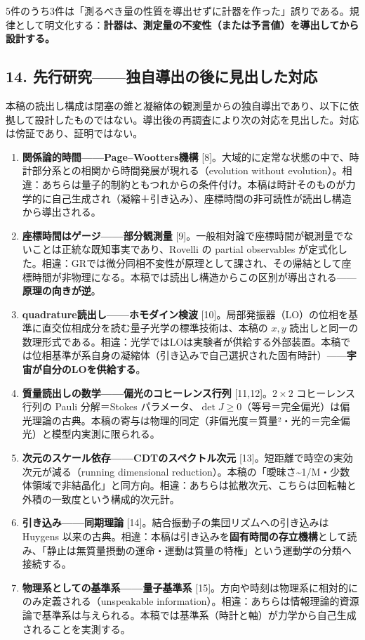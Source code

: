 \documentclass[
  a4paper,
]{ltjsarticle}
\providecommand{\tightlist}{%
  \setlength{\itemsep}{0pt}\setlength{\parskip}{0pt}}
\begin{document}
5件のうち3件は「測るべき量の性質を導出せずに計器を作った」誤りである。規律として明文化する：\textbf{計器は、測定量の不変性（または予言値）を導出してから設計する。}

\subsection{14.
先行研究------独自導出の後に見出した対応}\label{ux5148ux884cux7814ux7a76ux72ecux81eaux5c0eux51faux306eux5f8cux306bux898bux51faux3057ux305fux5bfeux5fdc}

本稿の読出し構成は閉塞の錐と凝縮体の観測量からの独自導出であり、以下に依拠して設計したものではない。導出後の再調査により次の対応を見出した。対応は傍証であり、証明ではない。

\begin{enumerate}
\def\labelenumi{\arabic{enumi}.}
\tightlist
\item
  \textbf{関係論的時間------Page--Wootters機構}
  {[}8{]}。大域的に定常な状態の中で、時計部分系との相関から時間発展が現れる（evolution
  without
  evolution）。相違：あちらは量子的制約ともつれからの条件付け。本稿は時計そのものが力学的に自己生成され（凝縮＋引き込み）、座標時間の非可読性が読出し構造から導出される。
\item
  \textbf{座標時間はゲージ------部分観測量}
  {[}9{]}。一般相対論で座標時間が観測量でないことは正統な既知事実であり、Rovelli
  の partial observables
  が定式化した。相違：GRでは微分同相不変性が原理として課され、その帰結として座標時間が非物理になる。本稿では読出し構造からこの区別が導出される------\textbf{原理の向きが逆}。
\item
  \textbf{quadrature読出し------ホモダイン検波}
  {[}10{]}。局部発振器（LO）の位相を基準に直交位相成分を読む量子光学の標準技術は、本稿の
  \(x, y\)
  読出しと同一の数理形式である。相違：光学ではLOは実験者が供給する外部装置。本稿では位相基準が系自身の凝縮体（引き込みで自己選択された固有時計）------\textbf{宇宙が自分のLOを供給する}。
\item
  \textbf{質量読出しの数学------偏光のコヒーレンス行列}
  {[}11,12{]}。\(2\times2\) コヒーレンス行列の Pauli 分解＝Stokes
  パラメータ、\(\det J\ge0\)（等号＝完全偏光）は偏光理論の古典。本稿の寄与は物理的同定（非偏光度＝質量²・光的＝完全偏光）と模型内実測に限られる。
\item
  \textbf{次元のスケール依存------CDTのスペクトル次元}
  {[}13{]}。短距離で時空の実効次元が減る（running dimensional
  reduction）。本稿の「曖昧さ\textasciitilde1/M・少数体領域で非結晶化」と同方向。相違：あちらは拡散次元、こちらは回転軸と外積の一致度という構成的次元計。
\item
  \textbf{引き込み------同期理論}
  {[}14{]}。結合振動子の集団リズムへの引き込みは Huygens
  以来の古典。相違：本稿は引き込みを\textbf{固有時間の存立機構}として読み、「静止は無質量摂動の運命・運動は質量の特権」という運動学の分類へ接続する。
\item
  \textbf{物理系としての基準系------量子基準系}
  {[}15{]}。方向や時刻は物理系に相対的にのみ定義される（unspeakable
  information）。相違：あちらは情報理論的資源論で基準系は与えられる。本稿では基準系（時計と軸）が力学から自己生成されることを実測する。
\end{enumerate}
\end{document}
